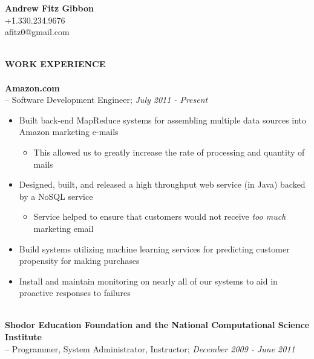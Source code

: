 \documentclass[10pt]{article}
\begin{document}
\begin{center}
\textbf{Andrew Fitz Gibbon}~\\
+1.330.234.9676~\\
afitz0@gmail.com~\\
\end{center}
~\\
\textbf{WORK EXPERIENCE}~\\
~\\
\indent\textbf{Amazon.com}~\\
\indent \indent -- Software Development Engineer; \textit{July 2011 - Present}
\begin{itemize}
  \addtolength{\itemsep}{-2mm}
		\item \indent Built back-end MapReduce systems for assembling multiple data sources into Amazon marketing e-mails
		\vspace{-2mm}
		\begin{itemize}
			\addtolength{\itemsep}{-2mm}
			\item This allowed us to greatly increase the rate of processing and quantity of mails
		\end{itemize}
		\vspace{-2mm}
    \item \indent Designed, built, and released a high throughput web service (in Java) backed by a NoSQL service
		\vspace{-2mm}
		\begin{itemize}
			\addtolength{\itemsep}{-2mm}
			\item Service helped to ensure that customers would not receive \textit{too much} marketing email
		\end{itemize}
		\vspace{-2mm}
    \item \indent Build systems utilizing machine learning services for predicting customer propensity for making purchases
    \item \indent Install and maintain monitoring on nearly all of our systems to aid in proactive responses to failures
\end{itemize}
~\\
\indent\textbf{Shodor Education Foundation and the National Computational Science Institute}~\\
\indent \indent -- Programmer, System Administrator, Instructor; \textit{December 2009 - June 2011}
\end{document}
